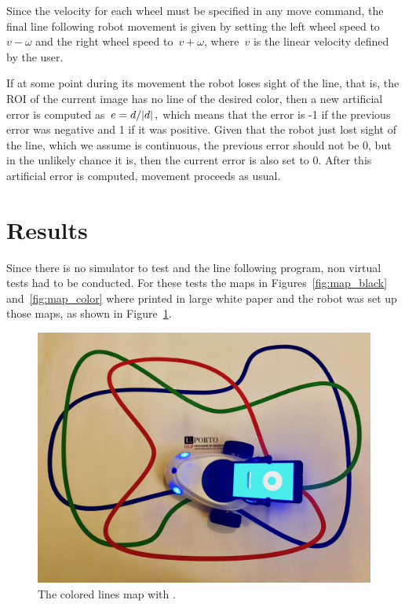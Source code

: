 \documentclass[10pt,conference,compsoc]{IEEEtran}
\begin{document}
Since the velocity for each wheel must be specified in any move command, the final line following robot movement is given by setting the left wheel speed to~$v - \omega$ and the right wheel speed to~$v + \omega$, where~$v$ is the linear velocity defined by the user.

If at some point during its movement the robot loses sight of the line, that is, the ROI of the current image has no line of the desired color, then a new artificial error is computed as~$e = d / \abs{d},$ which means that the error is -1 if the previous error was negative and 1 if it was positive. Given that the robot just lost sight of the line, which we assume is continuous, the previous error should not be 0, but in the unlikely chance it is, then the current error is also set to 0. After this artificial error is computed, movement proceeds as usual.


\section{Results}

Since there is no simulator to test \robobo and the line following program, non virtual tests had to be conducted. For these tests the maps in Figures~\ref{fig:map_black} and~\ref{fig:map_color} where printed in large white paper and the robot was set up those maps, as shown in Figure~\ref{fig:map_color_robobo}.

\begin{figure}[thpb]
\centering
\includegraphics[scale=0.05]{img/map_color_robobo.jpg}
\caption{The colored lines map with \robobo.}
\label{fig:map_color_robobo}
\end{figure}
\end{document}
